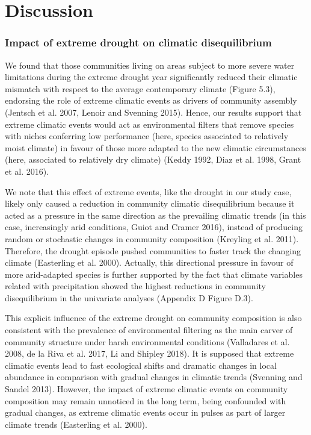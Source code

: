 \documentclass[11pt,twoside]{reedthesis}
\begin{document}
\section{Discussion}\label{discussion-3}

\subsubsection{Impact of extreme drought on climatic
disequilibrium}\label{impact-of-extreme-drought-on-climatic-disequilibrium}

We found that those communities living on areas subject to more severe
water limitations during the extreme drought year significantly reduced
their climatic mismatch with respect to the average contemporary climate
(Figure 5.3), endorsing the role of extreme climatic events as drivers
of community assembly (Jentsch et al. 2007, Lenoir and Svenning 2015).
Hence, our results support that extreme climatic events would act as
environmental filters that remove species with niches conferring low
performance (here, species associated to relatively moist climate) in
favour of those more adapted to the new climatic circumstances (here,
associated to relatively dry climate) (Keddy 1992, Diaz et al. 1998,
Grant et al. 2016).\par

We note that this effect of extreme events, like the drought in our
study case, likely only caused a reduction in community climatic
disequilibrium because it acted as a pressure in the same direction as
the prevailing climatic trends (in this case, increasingly arid
conditions, Guiot and Cramer 2016), instead of producing random or
stochastic changes in community composition (Kreyling et al. 2011).
Therefore, the drought episode pushed communities to faster track the
changing climate (Easterling et al. 2000). Actually, this directional
pressure in favour of more arid-adapted species is further supported by
the fact that climate variables related with precipitation showed the
highest reductions in community disequilibrium in the univariate
analyses (Appendix D Figure D.3).\par

This explicit influence of the extreme drought on community composition
is also consistent with the prevalence of environmental filtering as the
main carver of community structure under harsh environmental conditions
(Valladares et al. 2008, de la Riva et al. 2017, Li and Shipley 2018).
It is supposed that extreme climatic events lead to fast ecological
shifts and dramatic changes in local abundance in comparison with
gradual changes in climatic trends (Svenning and Sandel 2013). However,
the impact of extreme climatic events on community composition may
remain unnoticed in the long term, being confounded with gradual
changes, as extreme climatic events occur in pulses as part of larger
climate trends (Easterling et al. 2000).\par
\end{document}
